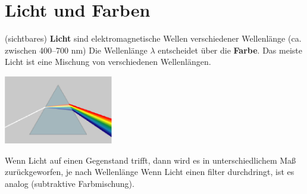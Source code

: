 \chapter{Licht und Farben}
\Defi (sichtbares) \textbf{Licht} sind elektromagnetische Wellen verschiedener Wellenlänge (ca. zwischen 400--700 nm)
	Die Wellenlänge $\lambda$ entscheidet über die \textbf{Farbe}. Das meiste Licht ist eine Mischung von verschiedenen Wellenlängen.
\begin{center}
 \includegraphics[height=3cm]{Prism_rainbow_schema.eps}
\end{center}
Wenn Licht auf einen Gegenstand trifft, dann wird es in unterschiedlichem Maß zurückgeworfen, je nach Wellenlänge
Wenn Licht einen filter durchdringt, ist es analog (subtraktive Farbmischung).

